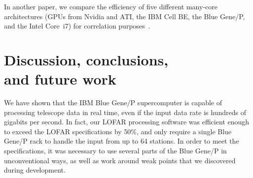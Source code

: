 \documentclass{sig-alternate}
\begin{document}
In another paper, we compare the efficiency of five different many-core
architectures (GPUs from Nvidia and ATI, the IBM Cell BE, the Blue Gene/P,
and the Intel Core~i7) for correlation purposes~\cite{Nieuwpoort:09}.





\section{Discussion, conclusions, \\ and future work}

We have shown that the IBM Blue Gene/P supercomputer is capable of processing telescope data in real time,
even if the input data rate is hundreds of gigabits per second. In fact, our LOFAR processing software was efficient enough to exceed the LOFAR specifications by 50\%, and only require a single Blue Gene/P rack to handle the input from up to 64 stations. In order to meet the specifications, it was necessary to use several parts of the Blue Gene/P in unconventional ways, as well as work around weak points that we discovered during development.
\end{document}
